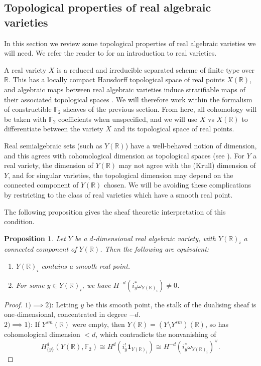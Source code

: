 \documentclass{amsart}
\newtheorem{prop}[thm]{Proposition}
\theoremstyle{definition}
\theoremstyle{remark}
\begin{document}
\subsection{Topological properties of real algebraic varieties}

In this section we review some topological properties of real algebraic varieties we will need. We refer the reader to \cite{bochnak1998real} for an introduction to real varieties.

A real variety $X$ is a reduced and irreducible separated scheme of finite type over $\mathbb{R}$. This has a locally compact Hausdorff topological space of real points $X(\mathbb{R})$, and algebraic maps between real algebraic varieties induce stratifiable maps of their associated topological spaces \cite[Ch. 9]{bochnak1998real}. We will therefore work within the formalism of constructible $\mathbb{F}_2$ sheaves of the previous section. From here, all cohomology will be taken with $\mathbb{F}_2$ coefficients when unspecified, and we will use $X$ vs $X(\mathbb{R})$ to differentiate between the variety $X$ and its topological space of real points.


Real semialgebraic sets (such as $Y(\mathbb{R})$) have a well-behaved notion of dimension, and this agrees with cohomological dimension as topological spaces (see \cite{delfs1991homology}). For $Y$ a real variety, the dimension of $Y(\mathbb{R})$ may not agree with the (Krull) dimension of $Y$, and for singular varieties, the topological dimension may depend on the connected component of $Y(\mathbb{R})$ chosen. We will be avoiding these complications by restricting to the class of real varieties which have a smooth real point.

The following proposition gives the sheaf theoretic interpretation of this condition.

\begin{prop}\label{Prop:smooth real point}
Let $Y$ be a $d$-dimensional real algebraic variety, with $Y(\mathbb{R})_i$ a connected component of $Y(\mathbb{R})$. Then the following are equivalent:
    \begin{enumerate}
        \item $Y(\mathbb{R})_i$ contains a smooth real point.
        \item For some $y\in Y(\mathbb{R})_i$, we have $H^{-d}(i_y^*\omega_{Y(\mathbb{R})_i})\neq 0$. 
    \end{enumerate}
\end{prop}

\begin{proof}
    $1)\implies 2)$: Letting $y$ be this smooth point, the stalk of the dualising sheaf is one-dimensional, concentrated in degree $-d$.\\
    $2)\implies 1)$: If $Y^{sm}(\mathbb{R})$ were empty, then $Y(\mathbb{R})=(Y\setminus Y^{sm})(\mathbb{R})$, so has cohomological dimension $<d$, which contradicts the nonvanishing of \[H^d_{\{y\}}(Y(\mathbb{R}),\mathbb{F}_2)\cong H^d(i_y^!\mathbf{1}_{Y(\mathbb{R})_i})\cong H^{-d}(i_y^*\omega_{Y(\mathbb{R})_i})^\vee.\]
\end{proof}
\end{document}
